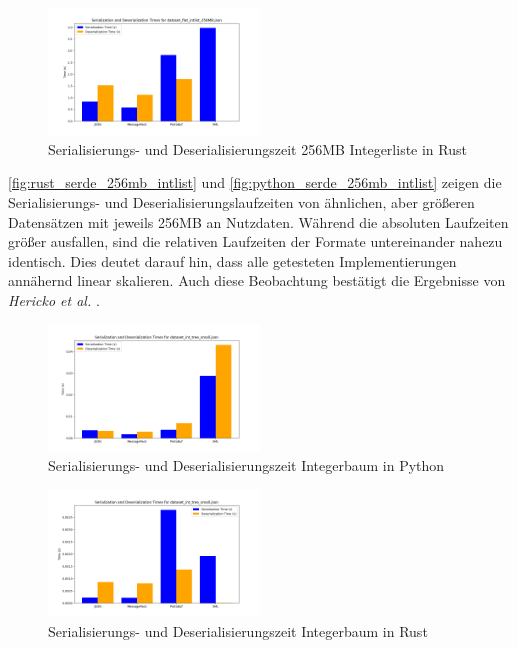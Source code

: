\documentclass[ngerman]{seminarvorlage}
\begin{document}
\begin{figure}[h]
  \centering
  \includegraphics[width=0.5\textwidth]{images/graphs/rust_dataset_flat_intlist_256MB_json_combined_times.png}
  \caption{Serialisierungs- und Deserialisierungszeit 256MB Integerliste in Rust}
  \label{fig:rust_serde_256mb_intlist}
\end{figure}

\autoref{fig:rust_serde_256mb_intlist} und \autoref{fig:python_serde_256mb_intlist} zeigen die Serialisierungs- und Deserialisierungslaufzeiten von ähnlichen, aber größeren Datensätzen mit jeweils 256MB an Nutzdaten. Während die absoluten Laufzeiten größer ausfallen, sind die relativen Laufzeiten der Formate untereinander nahezu identisch. Dies deutet darauf hin, dass alle getesteten Implementierungen annähernd linear skalieren. Auch diese Beobachtung bestätigt die Ergebnisse von \textit{Hericko et al.} \cite{10.1145/944579.944589, Figure 9}.

\begin{figure}[h]
  \centering
  \includegraphics[width=0.5\textwidth]{images/graphs/python_dataset_int_tree_small_json_combined_times.png}
  \caption{Serialisierungs- und Deserialisierungszeit Integerbaum in Python}
  \label{fig:python_serde_8mb_inttree}
\end{figure}

\begin{figure}[h]
  \centering
  \includegraphics[width=0.5\textwidth]{images/graphs/rust_dataset_int_tree_small_json_combined_times.png}
  \caption{Serialisierungs- und Deserialisierungszeit Integerbaum in Rust}
  \label{fig:rust_serde_8mb_inttree}
\end{figure}
\end{document}
